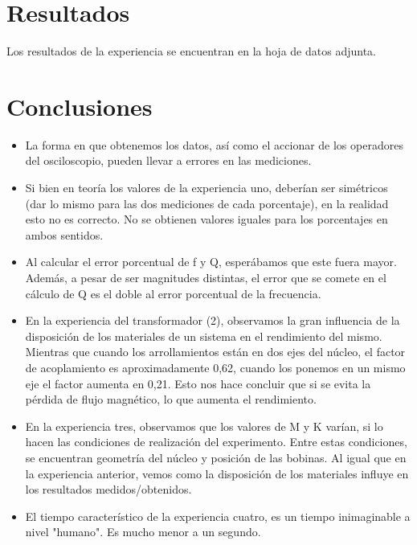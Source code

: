 \documentclass{article}
\begin{document}
\section{Resultados}
Los resultados de la experiencia se encuentran en la hoja de datos adjunta.

\section{Conclusiones}

\begin{itemize}
		\item La forma en que obtenemos los datos, así como el accionar de los operadores del osciloscopio, pueden llevar a errores en las mediciones.
		\item Si bien en teoría los valores de la experiencia uno, deberían ser simétricos (dar lo mismo para las dos mediciones de cada porcentaje), en la realidad esto no es correcto. No se obtienen valores iguales para los porcentajes en ambos sentidos.
		\item Al calcular el error porcentual de f y Q, esperábamos que este fuera mayor. Además, a pesar de ser magnitudes distintas, el error que se comete en el cálculo de Q es el doble al error porcentual de la frecuencia.
		\item En la experiencia del transformador (2), observamos la gran influencia de la disposición de los materiales de un sistema en el rendimiento del mismo. Mientras que cuando los arrollamientos están en dos ejes del núcleo, el factor de acoplamiento es aproximadamente 0,62, cuando los ponemos en un mismo eje el factor aumenta en 0,21. Esto nos hace concluir que si se evita la pérdida de flujo magnético, lo que aumenta el rendimiento.
		\item En la experiencia tres, observamos que los valores de M y K varían, si lo hacen las condiciones de realización del experimento. Entre estas condiciones, se encuentran geometría del núcleo y posición de las bobinas. Al igual que en la experiencia anterior, vemos como la disposición de los materiales influye en los resultados medidos/obtenidos.
		\item El tiempo característico de la experiencia cuatro, es un tiempo inimaginable a nivel "humano". Es mucho menor a un segundo.
\end{itemize}
\end{document}
